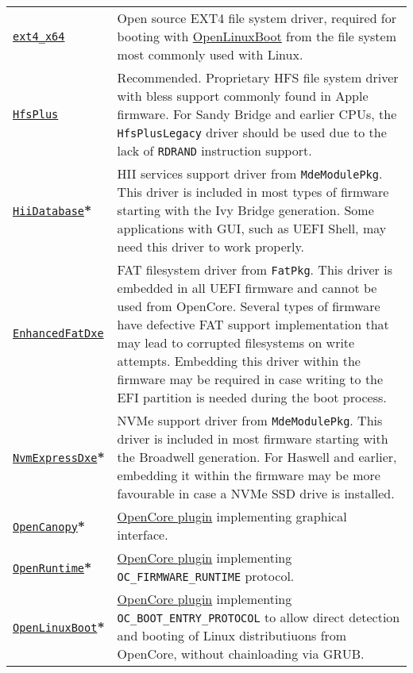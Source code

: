\documentclass[]{article}
\begin{document}
\begin{longtable}{p{1.65in}p{5.25in}}
\href{https://github.com/acidanthera/OcBinaryData}{\texttt{ext4\_x64}}
& Open source EXT4 file system driver, required for booting with \hyperref[uefilinux]{OpenLinuxBoot}
  from the file system most commonly used with Linux. \\
\href{https://github.com/acidanthera/OcBinaryData}{\texttt{HfsPlus}}
& Recommended. Proprietary HFS file system driver with bless support commonly found in Apple
  firmware. For Sandy Bridge and earlier CPUs, the \texttt{HfsPlusLegacy} driver should be
  used due to the lack of \texttt{RDRAND} instruction support. \\
\href{https://github.com/acidanthera/audk}{\texttt{HiiDatabase}}\textbf{*}
& HII services support driver from \texttt{MdeModulePkg}. This driver is included in
  most types of firmware starting with the Ivy Bridge generation. Some applications with GUI,
  such as UEFI Shell, may need this driver to work properly. \\
\href{https://github.com/acidanthera/audk}{\texttt{EnhancedFatDxe}}
& FAT filesystem driver from \texttt{FatPkg}. This driver is embedded in all
  UEFI firmware and cannot be used from OpenCore. Several types of firmware
  have defective FAT support implementation that may lead to corrupted filesystems
  on write attempts. Embedding this driver within the firmware may be required in case
  writing to the EFI partition is needed during the boot process. \\
\href{https://github.com/acidanthera/audk}{\texttt{NvmExpressDxe}}\textbf{*}
& NVMe support driver from \texttt{MdeModulePkg}. This driver is included in most
  firmware starting with the Broadwell generation. For Haswell and earlier, embedding it
  within the firmware may be more favourable in case a NVMe SSD drive is installed. \\
\href{https://github.com/acidanthera/OpenCorePkg}{\texttt{OpenCanopy}}\textbf{*}
& \hyperref[ueficanopy]{OpenCore plugin} implementing graphical interface. \\
\href{https://github.com/acidanthera/OpenCorePkg}{\texttt{OpenRuntime}}\textbf{*}
& \hyperref[uefiruntime]{OpenCore plugin} implementing \texttt{OC\_FIRMWARE\_RUNTIME} protocol. \\
\href{https://github.com/acidanthera/OpenCorePkg}{\texttt{OpenLinuxBoot}}\textbf{*}
& \hyperref[uefilinux]{OpenCore plugin} implementing \texttt{OC\_BOOT\_ENTRY\_PROTOCOL}
  to allow direct detection and booting of Linux distributiuons from OpenCore, without
  chainloading via GRUB. \\

\end{longtable}
\end{document}
